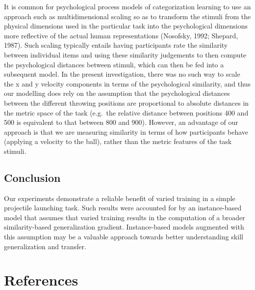 \documentclass[
  jou, donotrepeattitle,floatsintext]{apa7}
\begin{document}
It is common for psychological process models of categorization learning to use an approach such as multidimensional scaling so as to transform the stimuli from the physical dimensions used in the particular task into the psychological dimensions more reflective of the actual human representations (Nosofsky, 1992; Shepard, 1987). Such scaling typically entails having participants rate the similarity between individual items and using these similarity judgements to then compute the psychological distances between stimuli, which can then be fed into a subsequent model. In the present investigation, there was no such way to scale the x and y velocity components in terms of the psychological similarity, and thus our modelling does rely on the assumption that the psychological distances between the different throwing positions are proportional to absolute distances in the metric space of the task (e.g.~the relative distance between positions 400 and 500 is equivalent to that between 800 and 900). However, an advantage of our approach is that we are measuring similarity in terms of how participants behave (applying a velocity to the ball), rather than the metric features of the task stimuli.

\hypertarget{conclusion}{%
\subsection{Conclusion}\label{conclusion}}

Our experiments demonstrate a reliable benefit of varied training in a simple projectile launching task. Such results were accounted for by an instance-based model that assumes that varied training results in the computation of a broader similarity-based generalization gradient. Instance-based models augmented with this assumption may be a valuable approach towards better understanding skill generalization and transfer.

\newpage

\hypertarget{references}{%
\section{References}\label{references}}
\end{document}

